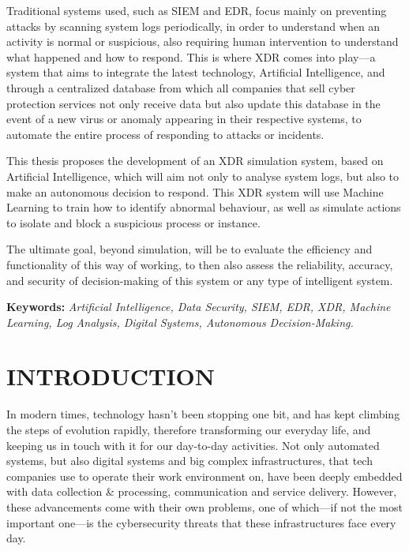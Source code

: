 \documentclass[12pt,a4paper]{report}
\begin{document}
Traditional systems used, such as SIEM and EDR, focus mainly on preventing attacks by scanning
system logs periodically, in order to understand when an activity is normal or suspicious, also
requiring human intervention to understand what happened and how to respond. This is where XDR
comes into play---a system that aims to integrate the latest technology, Artificial Intelligence,
and through a centralized database from which all companies that sell cyber protection services
not only receive data but also update this database in the event of a new virus or anomaly
appearing in their respective systems, to automate the entire process of responding to attacks or
incidents.

This thesis proposes the development of an XDR simulation system, based on Artificial
Intelligence, which will aim not only to analyse system logs, but also to make an autonomous
decision to respond. This XDR system will use Machine Learning to train how to identify abnormal
behaviour, as well as simulate actions to isolate and block a suspicious process or instance.

The ultimate goal, beyond simulation, will be to evaluate the efficiency and functionality of
this way of working, to then also assess the reliability, accuracy, and security of
decision-making of this system or any type of intelligent system.

\medskip
\noindent\textbf{Keywords:} \textit{Artificial Intelligence, Data Security, SIEM, EDR, XDR,
Machine Learning, Log Analysis, Digital Systems, Autonomous Decision-Making.}

\renewcommand{\contentsname}{Table of Contents}
\renewcommand{\listfigurename}{Table of Figures}
\tableofcontents
\clearpage

\listoffigures
\clearpage
\listoftables
\clearpage
{}
\setcounter{page}{1}
\chapter{INTRODUCTION}

In modern times, technology hasn't been stopping one bit, and has kept climbing the steps of
evolution rapidly, therefore transforming our everyday life, and keeping us in touch with it for
our day-to-day activities. Not only automated systems, but also digital systems and big complex
infrastructures, that tech companies use to operate their work environment on, have been deeply
embedded with data collection \& processing, communication and service delivery. However, these
advancements come with their own problems, one of which---if not the most important one---is the
cybersecurity threats that these infrastructures face every day.
\end{document}
